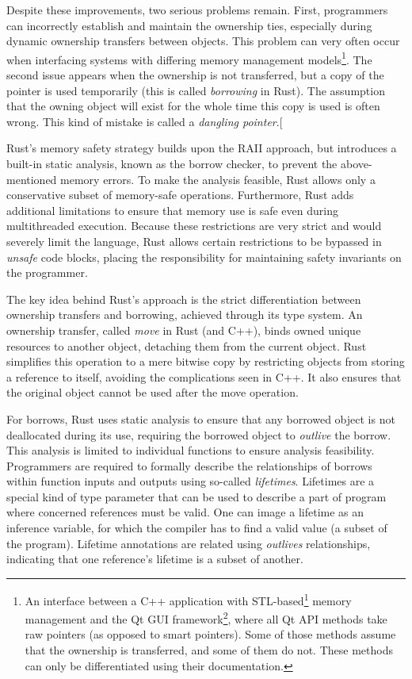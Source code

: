 \documentclass[
  11pt,
  twoside]{report}
\DeclareRobustCommand{\href}[2]{#2\footnote{\url{#1}}}
\begin{document}
Despite these improvements, two serious problems remain. First,
programmers can incorrectly establish and maintain the ownership ties,
especially during dynamic ownership transfers between objects. This
problem can very often occur when interfacing systems with differing
memory management models\footnote{An interface between a C++ application
  with
  \href{https://www.cppreference.com/Cpp_STL_ReferenceManual.pdf}{STL-based}
  memory management and the \href{https://www.qt.io/}{Qt GUI framework},
  where all Qt API methods take raw pointers (as opposed to smart
  pointers). Some of those methods assume that the ownership is
  transferred, and some of them do not. These methods can only be
  differentiated using their documentation.}. The second issue appears
when the ownership is not transferred, but a copy of the pointer is used
temporarily (this is called \emph{borrowing} in Rust). The assumption
that the owning object will exist for the whole time this copy is used
is often wrong. This kind of mistake is called a \emph{dangling
pointer}.{[}\citeproc{ref-danglingpointer}{6}{]}

Rust's memory safety strategy builds upon the RAII approach, but
introduces a built-in static analysis, known as the borrow checker, to
prevent the above-mentioned memory errors. To make the analysis
feasible, Rust allows only a conservative subset of memory-safe
operations. Furthermore, Rust adds additional limitations to ensure that
memory use is safe even during multithreaded execution. Because these
restrictions are very strict and would severely limit the language, Rust
allows certain restrictions to be bypassed in \emph{unsafe} code blocks,
placing the responsibility for maintaining safety invariants on the
programmer.

The key idea behind Rust's approach is the strict differentiation
between ownership transfers and borrowing, achieved through its type
system. An ownership transfer, called \emph{move} in Rust (and C++),
binds owned unique resources to another object, detaching them from the
current object. Rust simplifies this operation to a mere bitwise copy by
restricting objects from storing a reference to itself, avoiding the
complications seen in C++. It also ensures that the original object
cannot be used after the move operation.

For borrows, Rust uses static analysis to ensure that any borrowed
object is not deallocated during its use, requiring the borrowed object
to \emph{outlive} the borrow. This analysis is limited to individual
functions to ensure analysis feasibility. Programmers are required to
formally describe the relationships of borrows within function inputs
and outputs using so-called \emph{lifetimes}. Lifetimes are a special
kind of type parameter that can be used to describe a part of program
where concerned references must be valid. One can image a lifetime as an
inference variable, for which the compiler has to find a valid value (a
subset of the program). Lifetime annotations are related using
\emph{outlives} relationships, indicating that one reference's lifetime
is a subset of another.
\end{document}
